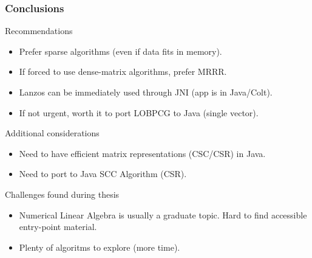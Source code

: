  \begin{frame}
  \frametitle{Conclusions}
  \begin{block}{Recommendations}
    \begin{itemize}
    \item Prefer sparse algorithms (even if data fits in memory).
    \item If forced to use dense-matrix algorithms, prefer MRRR.
    \item Lanzos can be immediately used through JNI (app is in Java/Colt).
    \item If not urgent, worth it to port LOBPCG to Java (single vector).
    \end{itemize}
  \end{block}
  \begin{block}{Additional considerations}
    \begin{itemize}
    \item Need to have efficient matrix representations (CSC/CSR) in Java.
    \item Need to port to Java SCC Algorithm (CSR).
    \end{itemize}
  \end{block}
  \begin{block}{Challenges found during thesis}
    \begin{itemize}
    \item Numerical Linear Algebra is usually a graduate topic. Hard to find accessible entry-point material.
    \item Plenty of algoritms to explore (more time).
    \end{itemize}
  \end{block}  
\end{frame}
